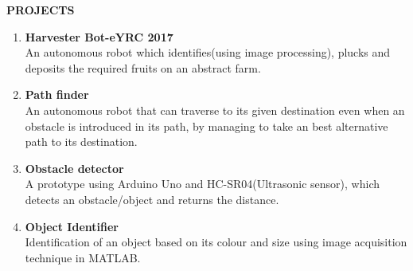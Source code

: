 \documentclass[a4paper]{article}
\begin{document}

	\begin{flushleft}
		\vspace{5mm}
		\large{\textbf{PROJECTS}} 
		\vspace{0.5mm}
		\noindent\hrulefill
		\vspace{0.5mm}
	\end{flushleft}
	\begin{enumerate}
		\item \textbf{Harvester Bot-eYRC 2017}\\
		An autonomous robot which identifies(using image processing), plucks and deposits the required fruits on an abstract farm.  
		\item \textbf{Path finder}\\
		An autonomous robot that can traverse to its given destination even when an obstacle is introduced in its path, by managing to take an best alternative path to its destination.  
		\item \textbf{Obstacle detector}\\
		A prototype using Arduino Uno and HC-SR04(Ultrasonic sensor), which detects an obstacle/object and returns the distance.
		\item \textbf{Object Identifier}\\
		Identification of an object based on its colour and size using image acquisition technique in MATLAB.				 	              
	\end{enumerate}
\end{document}
